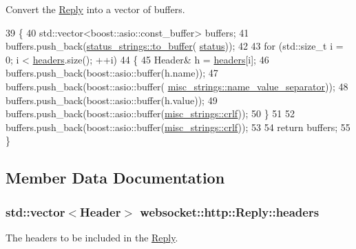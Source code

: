 Convert the \hyperlink{structwebsocket_1_1http_1_1Reply}{Reply} into a vector of buffers. 


\begin{DoxyCode}
39         \{
40             std::vector<boost::asio::const\_buffer> buffers;
41             buffers.push\_back(\hyperlink{namespacewebsocket_1_1http_1_1status__strings_a71a3c805bd5bbbf577264ca762da4299}{status\_strings::to\_buffer}(
      \hyperlink{structwebsocket_1_1http_1_1Reply_afa1b8fc57be88cfc33b7788d37ae42b8}{status}));
42 
43             \textcolor{keywordflow}{for} (std::size\_t i = 0; i < \hyperlink{structwebsocket_1_1http_1_1Reply_aa88f08563abdf43f15d7ff694ffd06e2}{headers}.size(); ++i)
44             \{
45                 Header& h = \hyperlink{structwebsocket_1_1http_1_1Reply_aa88f08563abdf43f15d7ff694ffd06e2}{headers}[i];
46                 buffers.push\_back(boost::asio::buffer(h.name));
47                 buffers.push\_back(boost::asio::buffer(
      \hyperlink{namespacewebsocket_1_1http_1_1misc__strings_a8fede78f1be63335d445aabd0277727e}{misc\_strings::name\_value\_separator}));
48                 buffers.push\_back(boost::asio::buffer(h.value));
49                 buffers.push\_back(boost::asio::buffer(\hyperlink{namespacewebsocket_1_1http_1_1misc__strings_a570bafe7096a0c7904f41f8d6ada54af}{misc\_strings::crlf}));
50             \}
51 
52             buffers.push\_back(boost::asio::buffer(\hyperlink{namespacewebsocket_1_1http_1_1misc__strings_a570bafe7096a0c7904f41f8d6ada54af}{misc\_strings::crlf}));
53 
54             \textcolor{keywordflow}{return} buffers;
55         \}
\end{DoxyCode}


\subsection{Member Data Documentation}
\subsubsection[{\texorpdfstring{headers}{headers}}]{\setlength{\rightskip}{0pt plus 5cm}std\+::vector$<${\bf Header}$>$ websocket\+::http\+::\+Reply\+::headers}\hypertarget{structwebsocket_1_1http_1_1Reply_aa88f08563abdf43f15d7ff694ffd06e2}{}\label{structwebsocket_1_1http_1_1Reply_aa88f08563abdf43f15d7ff694ffd06e2}


The headers to be included in the \hyperlink{structwebsocket_1_1http_1_1Reply}{Reply}. 

